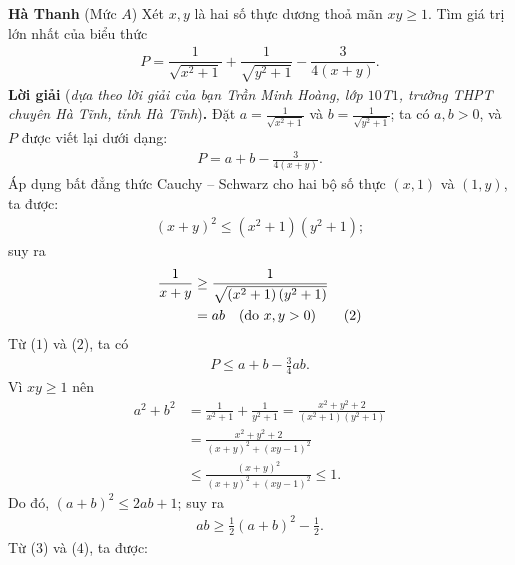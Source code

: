 \begin{multicols}{2}
	\vskip 0.05cm
	\hfill \textbf{\color{thachthuctoanhoc}Hà Thanh}
	\vskip 0.05cm
	{}
	(Mức $A$) Xét $x,y$ là hai số thực dương thoả mãn $xy\ge 1$. Tìm giá trị lớn nhất của biểu thức
	\begin{align*}
		P=\dfrac1{\sqrt{x^2+1}}+\dfrac1{\sqrt{y^2+1}}-\dfrac3{4(x+y)}.
	\end{align*}
	\textbf{\color{thachthuctoanhoc}Lời giải} (\textit{dựa theo lời giải của bạn Trần Minh Hoàng, lớp $10$T$1$, trường THPT chuyên Hà Tĩnh, tỉnh Hà Tĩnh})\textbf{\color{thachthuctoanhoc}.}
	\vskip 0.05cm
	Đặt $a = \frac{1}{{\sqrt {{x^2} + 1} }}$  và  $b = \frac{1}{{\sqrt {{y^2} + 1} }}$; ta có $a, b > 0$, và $P$ được viết lại dưới dạng:
	\begin{align*}
		P = a + b - \frac{3}{{4\left( {x + y} \right)}}. \tag{$1$}
	\end{align*}
	Áp dụng bất đẳng thức Cauchy -- Schwarz cho hai bộ số thực $(x, 1)$ và $(1, y)$, ta được:
	\begin{align*}
		{\left( {x + y} \right)^2} \le \left( {{x^2} + 1} \right)\left( {{y^2} + 1} \right);
	\end{align*}
	suy ra
	\begin{align*}
		\frac{1}{{x + y}} &\ge \frac{1}{{\sqrt {\left( {{x^2} + 1} \right)\left( {{y^2} + 1} \right)} }} \\
		&= ab \quad(\text{\color{black}do } x,y >0) \tag{$2$}
	\end{align*}
	Từ ($1$) và ($2$), ta có
	\begin{align*}
		P \le a + b - \frac{3}{4}ab. \tag{$3$}
	\end{align*}
	Vì $xy \ge 1$ nên
	\begin{align*}
		{a^2} \!+\! {b^2} &= \frac{1}{{{x^2} \!+\! 1}} \!+\! \frac{1}{{{y^2} \!+\! 1}} \!=\! \frac{{{x^2} \!+\! {y^2} \!+\! 2}}{{\left( {{x^2} \!+\! 1} \right)\!\left( {{y^2} \!+\! 1} \right)}} \\
		&= \frac{{{x^2} + {y^2} + 2}}{{{{\left( {x + y} \right)}^2} + {{\left( {xy - 1} \right)}^2}}} \\
		&\le \frac{{{{\left( {x + y} \right)}^2}}}{{{{\left( {x + y} \right)}^2} + {{\left( {xy - 1} \right)}^2}}} \le 1.
	\end{align*}
	Do đó, ${\left( {a + b} \right)^2} \le 2ab + 1$; suy ra
	\begin{align*}
		ab \ge \frac{1}{2}{\left( {a + b} \right)^2} - \frac{1}{2}.
	\end{align*}
	Từ ($3$) và ($4$), ta được:
	\begin{align*}

\end{align*}
\end{multicols}
